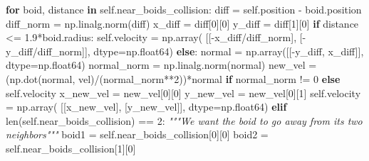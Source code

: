 \documentclass[
]{article}
\newenvironment{Shaded}{}{}
\newcommand{\BuiltInTok}[1]{#1}
\newcommand{\CommentTok}[1]{\textcolor[rgb]{0.38,0.63,0.69}{\textit{#1}}}
\newcommand{\ControlFlowTok}[1]{\textcolor[rgb]{0.00,0.44,0.13}{\textbf{#1}}}
\newcommand{\DecValTok}[1]{\textcolor[rgb]{0.25,0.63,0.44}{#1}}
\newcommand{\FloatTok}[1]{\textcolor[rgb]{0.25,0.63,0.44}{#1}}
\newcommand{\KeywordTok}[1]{\textcolor[rgb]{0.00,0.44,0.13}{\textbf{#1}}}
\newcommand{\NormalTok}[1]{#1}
\newcommand{\OperatorTok}[1]{\textcolor[rgb]{0.40,0.40,0.40}{#1}}
\newcommand{\VariableTok}[1]{\textcolor[rgb]{0.10,0.09,0.49}{#1}}
\begin{document}
\begin{Shaded}
\begin{Highlighting}[]
        \ControlFlowTok{for}\NormalTok{ boid, distance }\KeywordTok{in} \VariableTok{self}\NormalTok{.near\_boids\_collision:}
\NormalTok{            diff }\OperatorTok{=} \VariableTok{self}\NormalTok{.position }\OperatorTok{{-}}\NormalTok{ boid.position}
\NormalTok{            diff\_norm }\OperatorTok{=}\NormalTok{ np.linalg.norm(diff)}
\NormalTok{            x\_diff }\OperatorTok{=}\NormalTok{ diff[}\DecValTok{0}\NormalTok{][}\DecValTok{0}\NormalTok{]}
\NormalTok{            y\_diff }\OperatorTok{=}\NormalTok{ diff[}\DecValTok{1}\NormalTok{][}\DecValTok{0}\NormalTok{]}
            \ControlFlowTok{if}\NormalTok{ distance }\OperatorTok{\textless{}=} \FloatTok{1.9}\OperatorTok{*}\NormalTok{boid.radius:}
                \VariableTok{self}\NormalTok{.velocity }\OperatorTok{=}\NormalTok{ np.array(}
\NormalTok{                    [[}\OperatorTok{{-}}\NormalTok{x\_diff}\OperatorTok{/}\NormalTok{diff\_norm], [}\OperatorTok{{-}}\NormalTok{y\_diff}\OperatorTok{/}\NormalTok{diff\_norm]], dtype}\OperatorTok{=}\NormalTok{np.float64)}
            \ControlFlowTok{else}\NormalTok{:}
\NormalTok{                normal }\OperatorTok{=}\NormalTok{ np.array([[}\OperatorTok{{-}}\NormalTok{y\_diff, x\_diff]], dtype}\OperatorTok{=}\NormalTok{np.float64)}
\NormalTok{                normal\_norm }\OperatorTok{=}\NormalTok{ np.linalg.norm(normal)}
\NormalTok{                new\_vel }\OperatorTok{=}\NormalTok{ (np.dot(normal, vel)}\OperatorTok{/}\NormalTok{(normal\_norm}\OperatorTok{**}\DecValTok{2}\NormalTok{))}\OperatorTok{*}\NormalTok{normal }\ControlFlowTok{if}\NormalTok{ normal\_norm }\OperatorTok{!=} \DecValTok{0} \ControlFlowTok{else} \VariableTok{self}\NormalTok{.velocity}
\NormalTok{                x\_new\_vel }\OperatorTok{=}\NormalTok{ new\_vel[}\DecValTok{0}\NormalTok{][}\DecValTok{0}\NormalTok{]}
\NormalTok{                y\_new\_vel }\OperatorTok{=}\NormalTok{ new\_vel[}\DecValTok{0}\NormalTok{][}\DecValTok{1}\NormalTok{]}
                \VariableTok{self}\NormalTok{.velocity }\OperatorTok{=}\NormalTok{ np.array(}
\NormalTok{                    [[x\_new\_vel], [y\_new\_vel]], dtype}\OperatorTok{=}\NormalTok{np.float64)}
    \ControlFlowTok{elif} \BuiltInTok{len}\NormalTok{(}\VariableTok{self}\NormalTok{.near\_boids\_collision) }\OperatorTok{==} \DecValTok{2}\NormalTok{:}
        \CommentTok{"""We want the boid to go away from it\textquotesingle{}s two neighbors"""}
\NormalTok{        boid1 }\OperatorTok{=} \VariableTok{self}\NormalTok{.near\_boids\_collision[}\DecValTok{0}\NormalTok{][}\DecValTok{0}\NormalTok{]}
\NormalTok{        boid2 }\OperatorTok{=} \VariableTok{self}\NormalTok{.near\_boids\_collision[}\DecValTok{1}\NormalTok{][}\DecValTok{0}\NormalTok{]}

\end{Highlighting}
\end{Shaded}
\end{document}

